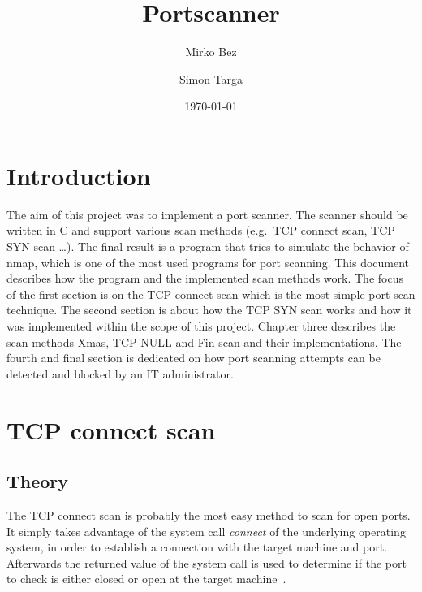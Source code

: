 \documentclass[a4paper]{scrartcl}
\begin{document}
	\title{Portscanner} \author{Mirko Bez \and  Simon Targa} \date{\today} \maketitle
	\tableofcontents
	\newpage
	
	\section*{Introduction}
	The aim of this project was to implement a port scanner. The scanner should be written in C and support various scan methods (e.g.\ TCP connect scan, TCP SYN scan \dots).
	The final result is a program that tries to simulate the behavior of nmap, which is one of the most used programs for port scanning. This document
	describes how the program and the implemented scan methods work. The focus of the first section is on the TCP connect scan which is the most simple port scan technique. The second
	section is about how the TCP SYN scan works and how it was implemented within the scope of this project. Chapter three describes the scan methods Xmas, TCP NULL and Fin scan and their
	implementations. The fourth and final section is dedicated on how port scanning attempts can be detected and blocked by an IT administrator.
	
	
	\section{TCP connect scan}
	\subsection{Theory}
	The TCP connect scan is probably the most easy method to scan for open ports. It simply takes advantage of the system call
	\emph{connect} of the underlying operating system, in order to establish a connection with the target machine and port. Afterwards the
	returned value of the system call is used to determine if the port to check is either closed or open at the target machine~\cite{nmap2009}. 
	
	
\end{document}
